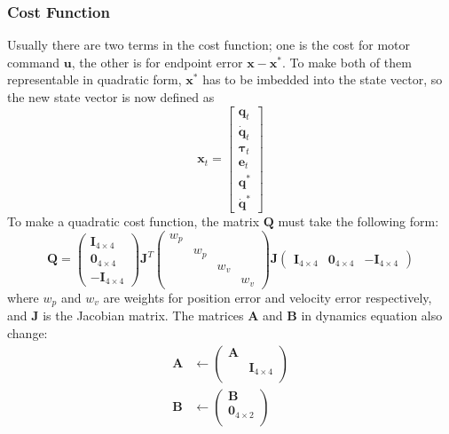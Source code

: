 \subsubsection{Cost Function}
\label{app:cost}
Usually there are two terms in the cost function; one is the cost for motor command $\bm{u}$, the other is for endpoint error $\bm{x} - \bm{x}^*$. To make both of them representable in quadratic form, $\bm{x}^*$ has to be imbedded into the state vector, so the new state vector is now defined as
\begin{equation}
\bm{x}_t=\left[ \begin{matrix}\bm{q}_t \\ \dot{\bm{q}}_t \\ \bm{\tau}_t \\ \bm{e}_t \\
\bm{q}^* \\ \dot{\bm{q}}^*
\end{matrix} \right]
\end{equation}
To make a quadratic cost function, the matrix $\bm{Q}$ must take the following form:
\begin{equation}
\bm{Q} = 
\left( \begin{matrix}
\bm{I}_{4\times4} \\
\bm{0}_{4\times4} \\
\bm{-I}_{4\times4} 
\end{matrix} \right)
\bm{J}^T
\left( \begin{matrix}
w_p &&&\\
&w_p&& \\
&&w_v&\\
&&&w_v 
\end{matrix} \right)
\bm{J}
\left( \begin{matrix}
\bm{I}_{4\times4} &
\bm{0}_{4\times4} &
\bm{-I}_{4\times4} 
\end{matrix} \right)
\end{equation}
where $w_p$ and $w_v$ are weights for position error and velocity error respectively, and $\bm{J}$ is the Jacobian matrix. The matrices $\bm{A}$ and $\bm{B}$ in dynamics equation also change:
\begin{equation}
\begin{split}
\bm{A} & \leftarrow \left( \begin{matrix}
\bm{A} \\
&\bm{I}_{4\times4} \\
\end{matrix} \right) \\
\bm{B} & \leftarrow \left( \begin{matrix}
\bm{B} \\
\bm{0}_{4\times2} \\
\end{matrix} \right)
\end{split}
\end{equation}
